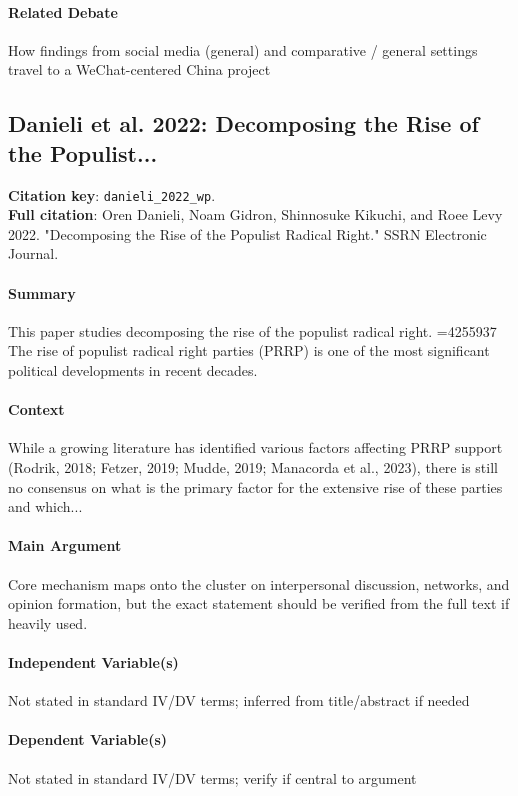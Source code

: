 \documentclass[12pt]{article}
\begin{document}
\paragraph{Related Debate} How findings from social media (general) and comparative / general settings travel to a WeChat-centered China project


\subsection{Danieli et al. 2022: Decomposing the Rise of the Populist...}
\textbf{Citation key}: \texttt{danieli\_2022\_wp}.\\
\textbf{Full citation}: Oren Danieli, Noam Gidron, Shinnosuke Kikuchi, and Roee Levy 2022. "Decomposing the Rise of the Populist Radical Right." SSRN Electronic Journal.

\paragraph{Summary} This paper studies decomposing the rise of the populist radical right. =4255937 The rise of populist radical right parties (PRRP) is one of the most significant political developments in recent decades.

\paragraph{Context} While a growing literature has identified various factors affecting PRRP support (Rodrik, 2018; Fetzer, 2019; Mudde, 2019; Manacorda et al., 2023), there is still no consensus on what is the primary factor for the extensive rise of these parties and which...

\paragraph{Main Argument} Core mechanism maps onto the cluster on interpersonal discussion, networks, and opinion formation, but the exact statement should be verified from the full text if heavily used.

\paragraph{Independent Variable(s)} Not stated in standard IV/DV terms; inferred from title/abstract if needed

\paragraph{Dependent Variable(s)} Not stated in standard IV/DV terms; verify if central to argument
\end{document}
